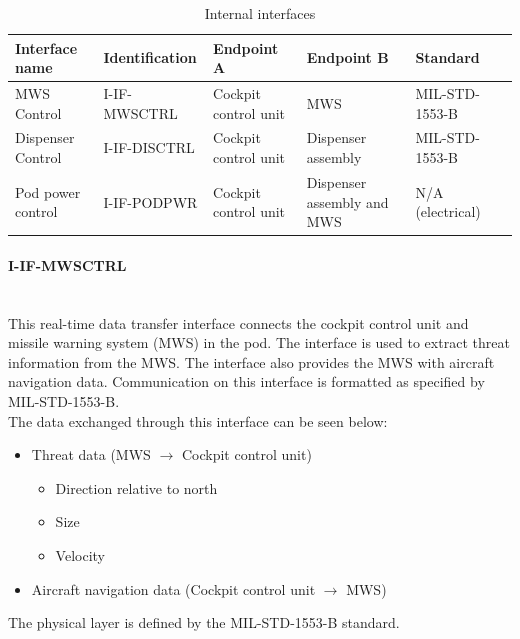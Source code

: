   \begin{center}
 \begin{table}[h]
 \caption{Internal interfaces}
 \label{tab:internal}
  \begin{tabular}{ | p{2cm} | l | p{2.3cm} | p{2.3cm} | l | p{1cm} |}
  \hline
   \textbf{Interface name} & \textbf{Identification} & \textbf{Endpoint A} & \textbf{Endpoint B} & \textbf{Standard}\\ \hline
 MWS Control & I-IF-MWSCTRL & Cockpit control unit & MWS & MIL-STD-1553-B\\ \hline
 Dispenser Control & I-IF-DISCTRL & Cockpit control unit & Dispenser assembly & MIL-STD-1553-B\\ \hline
Pod power control & I-IF-PODPWR & Cockpit control unit & Dispenser assembly and MWS & N/A (electrical)\\ \hline
  \end{tabular}
  \end{table}
  \end{center}
  
\paragraph{I-IF-MWSCTRL}\mbox{}\\
This real-time data transfer interface connects the cockpit control unit and missile warning system (MWS) in the pod. The interface is used to extract threat information from the MWS. The interface also provides the MWS with aircraft navigation data.
Communication on this interface is formatted as specified by MIL-STD-1553-B.
  \\
The data exchanged through this interface can be seen below:
  \begin{itemize}
  \item Threat data (MWS $\rightarrow$ Cockpit control unit)
	\begin{itemize}  	
  	\item Direction relative to north
  	\item Size
  	\item Velocity
  	\end{itemize}
  \item Aircraft navigation data (Cockpit control unit $\rightarrow$ MWS)
  
  \end{itemize}
  The physical layer is defined by the MIL-STD-1553-B standard.
  
